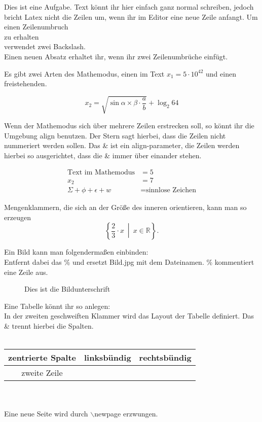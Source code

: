 \documentclass{uebungsblatt}
\begin{document}
Dies ist eine Aufgabe. Text könnt ihr hier einfach ganz normal schreiben, jedoch bricht
Latex
nicht
die
Zeilen
um, wenn ihr im Editor eine neue Zeile anfangt.
Um einen Zeilenumbruch \\
zu erhalten \\
verwendet zwei Backslash.\\
Einen neuen Absatz erhaltet ihr, wenn ihr zwei Zeilenumbrüche einfügt.

Es gibt zwei Arten des Mathemodus, einen im Text $x_1 = 5 \cdot 10^{42}$ und einen 
freistehenden.

\[x_2 = \sqrt{ \sin{ \alpha \times \beta} \cdot \frac{a}{b}} + \log_2{64}\]

Wenn der Mathemodus sich über mehrere Zeilen erstrecken soll, so könnt ihr die 
Umgebung align benutzen. Der Stern sagt hierbei, dass die Zeilen nicht nummeriert 
werden sollen. Das \& ist ein align-parameter, die Zeilen werden hierbei so ausgerichtet, 
dass die \& immer über einander stehen.

\begin{align*}
\text{Text im Mathemodus} & = 5\\
x_2 &= 7\\
\Sigma + \phi + \epsilon + w &= \text{sinnlose Zeichen}
\end{align*}

Mengenklammern, die sich an der Größe des inneren orientieren, kann man so erzeugen
\[\left\{ \frac{2}{3} \cdot x \ \middle| \ x \in \mathbb{R} \right\} .\]


Ein Bild kann man folgendermaßen einbinden: \\
Entfernt dabei das \% und ersetzt Bild.jpg mit dem Dateinamen. \% kommentiert 
eine Zeile aus.

\begin{figure}[H]
\centering
\caption{Dies ist die Bildunterschrift}
\end{figure}

Eine Tabelle könnt ihr so anlegen:\\
In der zweiten geschweiften Klammer wird das Layout der Tabelle definiert. 
Das \& trennt hierbei die Spalten.\\
\ \\ %
\begin{tabular}{c|lr}
  zentrierte Spalte & linksbündig & rechtsbündig\\
  \hline
  zweite Zeile & \\
\end{tabular}\\
\ \\
Eine neue Seite wird durch $\backslash$newpage erzwungen.
\newpage
\end{document}
